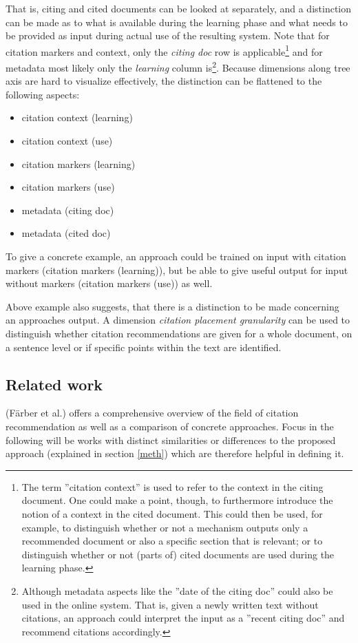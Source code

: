 \documentclass{proseminar}
\begin{document}
That is, citing and cited documents can be looked at separately, and a distinction can be made as to what is available during the learning phase and what needs to be provided as input during actual use of the resulting system. Note that for citation markers and context, only the \emph{citing doc} row is applicable\footnote{The term ''citation context'' is used to refer to the context in the citing document. One could make a point, though, to furthermore introduce the notion of a context in the cited document. This could then be used, for example, to distinguish whether or not a mechanism outputs only a recommended document or also a specific section that is relevant; or to distinguish whether or not (parts of) cited documents are used during the learning phase.} and for metadata most likely only the \emph{learning} column is\footnote{Although metadata aspects like the ''date of the citing doc'' could also be used in the online system. That is, given a newly written text without citations, an approach could interpret the input as a ''recent citing doc'' and recommend citations accordingly.}. Because dimensions along tree axis are hard to visualize effectively, the distinction can be flattened to the following aspects:

\begin{itemize}
    \item citation context (learning)
    \item citation context (use)
    \item citation markers (learning)
    \item citation markers (use)
    \item metadata (citing doc)
    \item metadata (cited doc)
\end{itemize}

To give a concrete example, an approach could be trained on input with citation markers (citation markers (learning)),  but be able to give useful output for input without markers (citation markers (use)) as well.

Above example also suggests, that there is a distinction to be made concerning an approaches output. A dimension \emph{citation placement granularity} can be used to distinguish whether citation recommendations are given for a whole document, on a sentence level or if specific points within the text are identified.

\subsection{Related work}\label{relwork}
\cite{Faerber} (F\"arber et al.) offers a comprehensive overview of the field of citation recommendation as well as a comparison of concrete approaches. Focus in the following will be works with distinct similarities or differences to the proposed approach (explained in section \ref{meth}) which are therefore helpful in defining it.
\end{document}
